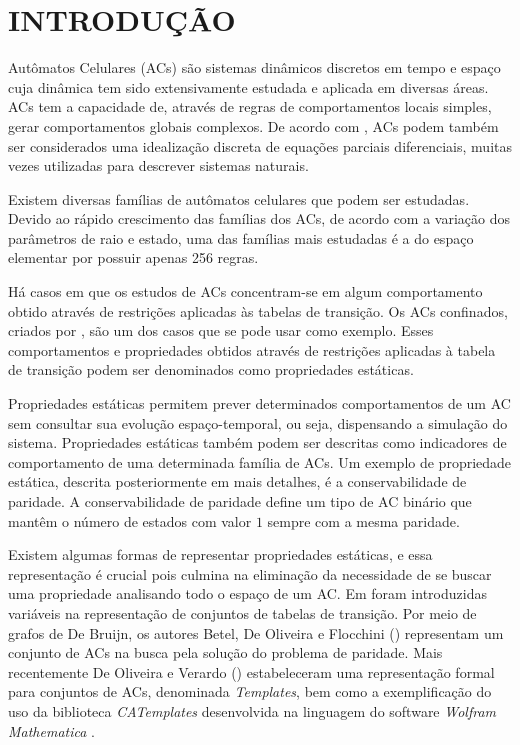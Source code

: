 \documentclass[12pt,a4paper]{article}
\let\stdsection\section
\renewcommand\section{\newpage\stdsection}
\begin{document}

\newpage
\pagestyle{plain}
\renewcommand{\baselinestretch}{1.4} 
\normalsize
\section{INTRODUÇÃO}\label{sec:introducao}
Autômatos Celulares (ACs) são sistemas dinâmicos discretos em tempo e espaço cuja dinâmica tem sido extensivamente estudada e aplicada em diversas áreas. ACs tem a capacidade de, através de regras de comportamentos locais simples, gerar comportamentos globais complexos. De acordo com , ACs podem também ser considerados uma idealização discreta de equações parciais diferenciais, muitas vezes utilizadas para descrever sistemas naturais.

Existem diversas famílias de autômatos celulares que podem ser estudadas. Devido ao rápido crescimento das famílias dos ACs, de acordo com a variação dos parâmetros de raio e estado, uma das famílias mais estudadas é a do espaço elementar por possuir apenas 256 regras.

Há casos em que os estudos de ACs concentram-se em algum comportamento obtido através de restrições aplicadas às tabelas de transição. Os ACs confinados, criados por , são um dos casos que se pode usar como exemplo. Esses comportamentos e propriedades obtidos através de restrições aplicadas à tabela de transição podem ser denominados como propriedades estáticas.

Propriedades estáticas permitem prever determinados comportamentos de um AC sem consultar sua evolução espaço-temporal, ou seja, dispensando a simulação do sistema. Propriedades estáticas também podem ser descritas como indicadores de comportamento de uma determinada família de ACs. Um exemplo de propriedade estática, descrita posteriormente em mais detalhes, é a conservabilidade de paridade. A conservabilidade de paridade define um tipo de AC binário que mantêm o número de estados com valor $1$ sempre com a mesma paridade.

Existem algumas formas de representar propriedades estáticas, e essa representação é crucial pois culmina na eliminação da necessidade de se buscar uma propriedade analisando todo o espaço de um AC. Em  foram introduzidas variáveis na representação de conjuntos de tabelas de transição. Por meio de grafos de De Bruijn, os autores Betel, De Oliveira e Flocchini (\citeyear{Betel2013}) representam um conjunto de ACs na busca pela solução do problema de paridade. Mais recentemente De Oliveira e Verardo (\citeyear{deOliveira2014}) estabeleceram uma representação formal para conjuntos de ACs, denominada \textit{Templates}, bem como a exemplificação do uso da biblioteca \textit{CATemplates} \cite{CATemplates} desenvolvida na linguagem do software \textit{Wolfram Mathematica} \cite{woframMathematica10}.
\end{document}
